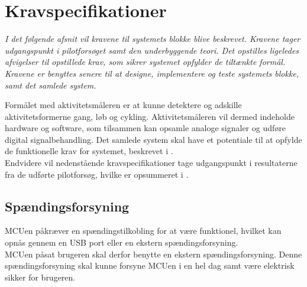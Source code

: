 \section{Kravspecifikationer}\label{Sec:krav}
\textit{I det følgende afsnit vil kravene til systemets blokke blive beskrevet. Kravene tager udgangspunkt i pilotforsøget samt den underbyggende teori. Det opstilles ligeledes afvigelser til opstillede krav, som sikrer systemet opfylder de tiltænkte formål. Kravene er benyttes senere til at designe, implementere og teste systemets blokke, samt det samlede system.}

Formålet med aktivitetsmåleren er at kunne detektere og adskille aktivitetsformerne gang, løb og cykling. Aktivitetsmåleren vil dermed indeholde hardware og software, som tilsammen kan opsamle analoge signaler og udføre digital signalbehandling. Det samlede system skal have et potentiale til at opfylde de funktionelle krav for systemet, beskrevet i . \\
Endvidere vil nedenstående kravspecifikationer tage udgangspunkt i resultaterne fra de udførte pilotforsøg, hvilke er opsummeret i .
%

\subsection{Spændingsforsyning} \label{krav_spaendingsf}
MCUen påkræver en spændingstilkobling for at være funktionel, hvilket kan opnås gennem en USB port eller en ekstern spændingsforsyning.\\
MCUen påsat brugeren skal derfor benytte en ekstern spændingsforsyning. Denne spændingsforsyning skal kunne forsyne MCUen i en hel dag samt være elektrisk sikker for brugeren. %

